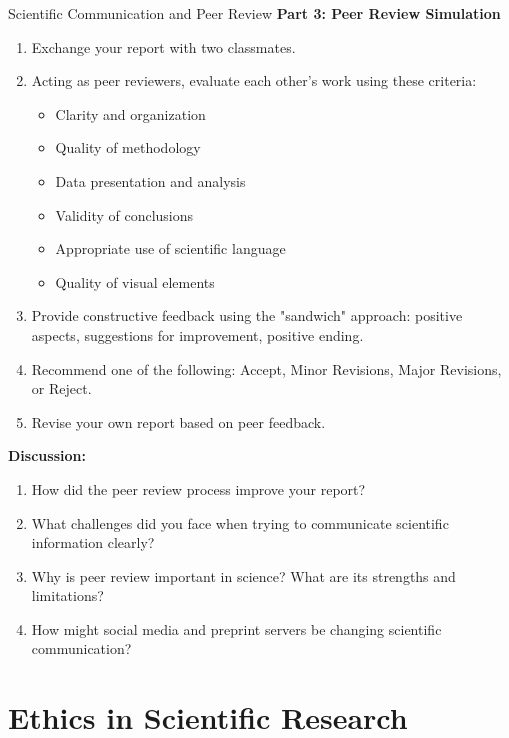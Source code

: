 \begin{investigation}{Scientific Communication and Peer Review}
\textbf{Part 3: Peer Review Simulation}
\begin{enumerate}
    \item Exchange your report with two classmates.
    \item Acting as peer reviewers, evaluate each other's work using these criteria:
    \begin{itemize}
        \item Clarity and organization
        \item Quality of methodology
        \item Data presentation and analysis
        \item Validity of conclusions
        \item Appropriate use of scientific language
        \item Quality of visual elements
    \end{itemize}
    \item Provide constructive feedback using the "sandwich" approach: positive aspects, suggestions for improvement, positive ending.
    \item Recommend one of the following: Accept, Minor Revisions, Major Revisions, or Reject.
    \item Revise your own report based on peer feedback.
\end{enumerate}

\textbf{Discussion:}
\begin{enumerate}
    \item How did the peer review process improve your report?
    \item What challenges did you face when trying to communicate scientific information clearly?
    \item Why is peer review important in science? What are its strengths and limitations?
    \item How might social media and preprint servers be changing scientific communication?
\end{enumerate}
\end{investigation}


\section{Ethics in Scientific Research}

